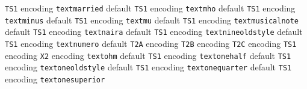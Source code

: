 \documentclass[twoside]{ltxdoc}
\makeatletter
\renewenvironment{theindex}{%
   \@restonecoltrue
   \if@twocolumn\@restonecolfalse\fi
   \columnseprule \z@
   \columnsep 35\p@
   \twocolumn[\index@prologue]%
   \IndexParms
   \let\item\@idxitem
   \ignorespaces
}{\if@restonecol\onecolumn\else\clearpage\fi}
\makeatother
\begin{document}
\begin{theindex}
    \subitem \texttt  {TS1} encoding\pfill {}
  \item \texttt  {textmarried}\efill 
    \subitem default\pfill {}
    \subitem \texttt  {TS1} encoding\pfill {}
  \item \texttt  {textmho}\efill 
    \subitem default\pfill {}
    \subitem \texttt  {TS1} encoding\pfill {}
  \item \texttt  {textminus}\efill 
    \subitem default\pfill {}
    \subitem \texttt  {TS1} encoding\pfill {}
  \item \texttt  {textmu}\efill 
    \subitem default\pfill {}
    \subitem \texttt  {TS1} encoding\pfill {}
  \item \texttt  {textmusicalnote}\efill 
    \subitem default\pfill {}
    \subitem \texttt  {TS1} encoding\pfill {}
  \item \texttt  {textnaira}\efill 
    \subitem default\pfill {}
    \subitem \texttt  {TS1} encoding\pfill {}
  \item \texttt  {textnineoldstyle}\efill 
    \subitem default\pfill {}
    \subitem \texttt  {TS1} encoding\pfill {}
  \item \texttt  {textnumero}\efill 
    \subitem default\pfill {}
    \subitem \texttt  {T2A} encoding\pfill {}
    \subitem \texttt  {T2B} encoding\pfill {}
    \subitem \texttt  {T2C} encoding\pfill {}
    \subitem \texttt  {TS1} encoding\pfill {}
    \subitem \texttt  {X2} encoding\pfill {}
  \item \texttt  {textohm}\efill 
    \subitem default\pfill {}
    \subitem \texttt  {TS1} encoding\pfill {}
  \item \texttt  {textonehalf}\efill 
    \subitem default\pfill {}
    \subitem \texttt  {TS1} encoding\pfill {}
  \item \texttt  {textoneoldstyle}\efill 
    \subitem default\pfill {}
    \subitem \texttt  {TS1} encoding\pfill {}
  \item \texttt  {textonequarter}\efill 
    \subitem default\pfill {}
    \subitem \texttt  {TS1} encoding\pfill {}
  \item \texttt  {textonesuperior}\efill 

\end{theindex}
\end{document}
